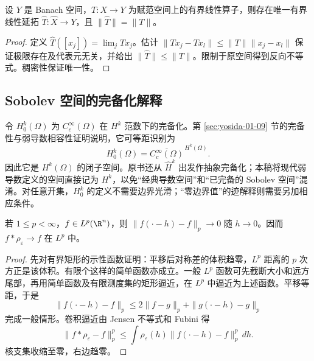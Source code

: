 \begin{proposition}[补充：算子的延拓性质]\label{prop:y1-extension}
设 $Y$ 是 Banach 空间，$T:X\to Y$ 为赋范空间上的有界线性算子，则存在唯一有界线性延拓 $\widehat T:\widehat X\to Y$，且 $\|\widehat T\|=\|T\|$。
\end{proposition}
\begin{proof}
定义 $\widehat T([x_j])=\lim_jTx_j$。估计 $\|Tx_j-Tx_l\|\le\|T\|\|x_j-x_l\|$ 保证极限存在及代表元无关，并给出 $\|\widehat T\|\le\|T\|$。限制于原空间得到反向不等式。稠密性保证唯一性。
\end{proof}

\subsection{Sobolev 空间的完备化解释}
令 $H_0^k(\Omega)$ 为 $C_c^\infty(\Omega)$ 在 $H^k$ 范数下的完备化。第 \ref{sec:yosida-01-09} 节的完备性与弱导数相容性证明说明，它可等距识别为
\[
 H_0^k(\Omega)=\overline{C_c^\infty(\Omega)}^{\,H^k(\Omega)}.
\]
因此它是 $H^k(\Omega)$ 的闭子空间。原书还从 $\widehat H^k$ 出发作抽象完备化；本稿将现代弱导数定义的空间直接记为 $H^k$，以免“经典导数空间”和“已完备的 Sobolev 空间”混淆。对任意开集，$H_0^k$ 的定义不需要边界光滑；“零边界值”的迹解释则需要另加相应条件。

\begin{lemma}[补充：$L^p$ 平移连续与正则化逼近]\label{lem:y1-Lp-translation}
若 $1\le p<\infty$，$f\in L^p(\R^n)$，则 $\|f(\cdot-h)-f\|_p\to0$ 随 $h\to0$。因而 $f*\rho_\varepsilon\to f$ 在 $L^p$ 中。
\end{lemma}
\begin{proof}
先对有界矩形的示性函数证明：平移后对称差的体积趋零，$L^p$ 距离的 $p$ 次方正是该体积。有限个这样的简单函数亦成立。一般 $L^p$ 函数可先截断大小和远方尾部，再用简单函数及有限测度集的矩形逼近，在 $L^p$ 中逼近为上述函数。平移等距，于是
\[
 \|f(\cdot-h)-f\|_p
 \le2\|f-g\|_p+\|g(\cdot-h)-g\|_p
\]
完成一般情形。卷积逼近由 Jensen 不等式和 Fubini 得
\[
 \|f*\rho_\varepsilon-f\|_p^p
 \le\int\rho_\varepsilon(h)\|f(\cdot-h)-f\|_p^p\,dh.
\]
核支集收缩至零，右边趋零。
\end{proof}

